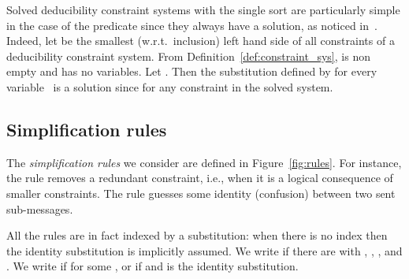 \documentclass[acmtocl,acmnow]{acmtrans2m}
\newcommand{\dedsys}[1]{deducibility constraint system}
\newcommand{\dedsyss}[1]{deducibility constraint systems}
\begin{document}
Solved \dedsyss{} with the single sort  are
particularly simple in the case of the  predicate since they
always have a solution, as noticed in~\cite{MS01}. Indeed, let 
be the smallest (w.r.t.~inclusion) left hand side of all constraints
of a \dedsys{}. From Definition~\ref{def:constraint_sys}, 
  is non empty and has no variables. Let . Then the substitution  defined by  for every
variable~ is a solution since  for any
constraint  in the solved system.







\subsection{Simplification rules}\label{sec:rules}


The \emph{simplification rules} we consider are defined in
Figure~\ref{fig:rules}. For instance, the rule   removes a redundant
constraint, i.e., when it is a logical consequence of smaller constraints.
The rule  guesses some identity (confusion) between two sent sub-messages.

All the rules are in fact indexed by a substitution:
when there is no index then the identity substitution is implicitly
assumed. We write  if there are
 with , ,
, and
. We write
 if  for some , or if  and  is the identity
substitution.
\end{document}
